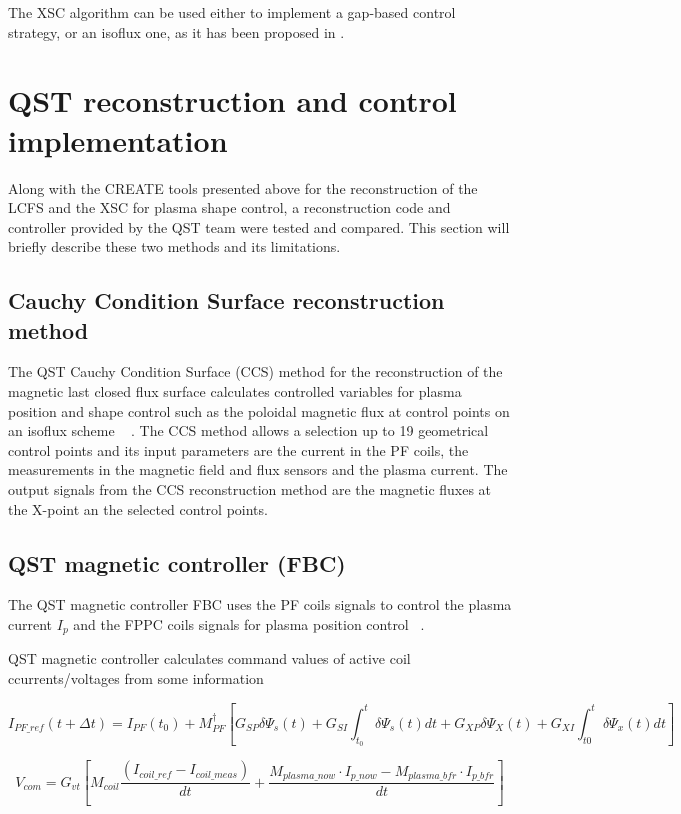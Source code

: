  The XSC algorithm can be used either to implement a gap-based control strategy, or an isoflux one, as it has been proposed in .

\section{QST reconstruction and control implementation}

Along with the CREATE tools presented above  for the reconstruction of the LCFS and the XSC for plasma shape control, a reconstruction code and controller provided by the QST team were tested and compared. This section will briefly describe these two methods and its limitations.  

\subsection{Cauchy Condition Surface reconstruction  method }
The QST Cauchy Condition Surface (CCS) method for the reconstruction of the magnetic last closed flux surface calculates controlled variables for plasma position and shape control such as the poloidal magnetic flux at control points on an isoflux scheme  ~\cite{CCS} . The CCS method allows a selection up to 19 geometrical control points and its input parameters are the current in the PF coils, the measurements in the magnetic field and flux sensors and the plasma current. The output signals from the CCS reconstruction method are the magnetic fluxes at the X-point an the selected control points. 

\subsection{QST magnetic controller (FBC)}


The QST magnetic controller FBC uses the PF coils signals to control the plasma current $I_p$ and the FPPC coils signals for plasma position control ~\cite{FBC}.

QST magnetic controller calculates command values of active coil ccurrents/voltages from some information

\begin{equation}
I_{PF\_ref}(t+\Delta t) = I_{PF}(t_0)+M^\dagger_{PF}\left[G_{SP}\delta\Psi_s(t)+G_{SI}\int_{t_0}^{t}\delta\Psi_s(t)dt+G_{XP}\delta\Psi_X(t)+G_{XI}\int_{t0}^{t}\delta\Psi_x(t)dt\right]
\end{equation}

\begin{equation}
V_{com}=G_{vt}\left[M_{coil}\frac{(I_{coil\_ref}-I_{coil\_meas})}{dt}+ \frac{M_{plasma\_now} \cdot I_{p\_now} - M_{plasma\_ bfr} \cdot I_{p\_bfr}}{dt}\right]
\end{equation}

